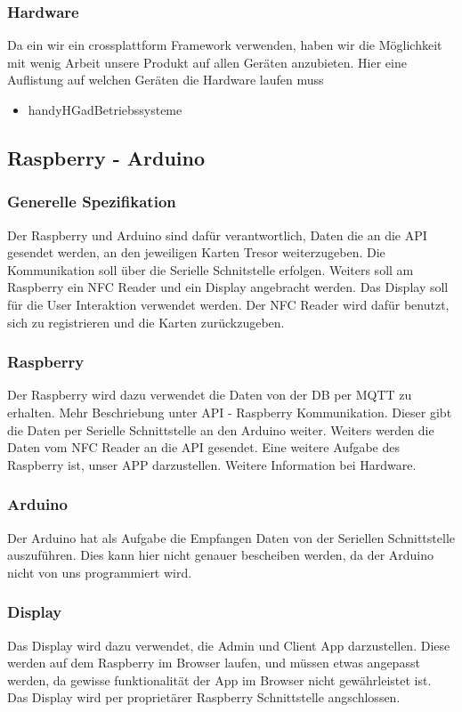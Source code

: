 \documentclass[a4paper]{article}
\begin{document}
\subsubsection{Hardware}
Da ein wir ein crossplattform Framework verwenden, haben wir die M\"oglichkeit mit wenig Arbeit unsere Produkt auf allen Ger\"aten anzubieten. Hier eine Auflistung auf welchen Ger\"aten die Hardware laufen muss
\begin{itemize}
  \item handyHGadBetriebssysteme
\end{itemize}

\newpage

\subsection{Raspberry - Arduino}
\subsubsection{Generelle Spezifikation}
Der Raspberry und Arduino sind dafür verantwortlich, Daten die an die API gesendet werden, an den jeweiligen Karten Tresor weiterzugeben. Die Kommunikation soll über die Serielle Schnitstelle erfolgen. Weiters soll am Raspberry ein NFC Reader und ein Display angebracht werden. Das Display soll für die User Interaktion verwendet werden. Der NFC Reader wird dafür benutzt, sich zu registrieren und die Karten zurückzugeben.

\subsubsection{Raspberry}
Der Raspberry wird dazu verwendet die Daten von der DB per MQTT zu erhalten. Mehr Beschriebung unter API - Raspberry Kommunikation. Dieser gibt die Daten per Serielle Schnittstelle an den Arduino weiter. Weiters werden die Daten vom NFC Reader an die API gesendet. Eine weitere Aufgabe des Raspberry ist, unser APP darzustellen. Weitere Information bei Hardware.

\subsubsection{Arduino}
Der Arduino hat als Aufgabe die Empfangen Daten von der Seriellen Schnittstelle auszuführen. Dies kann hier nicht genauer bescheiben werden, da der Arduino nicht von uns programmiert wird.

\subsubsection{Display}
Das Display wird dazu verwendet, die Admin und Client App darzustellen. Diese werden auf dem Raspberry im Browser laufen, und müssen etwas angepasst werden, da gewisse funktionalität der App im Browser nicht gewährleistet ist. Das Display wird per proprietärer Raspberry Schnittstelle angschlossen.
\end{document}
